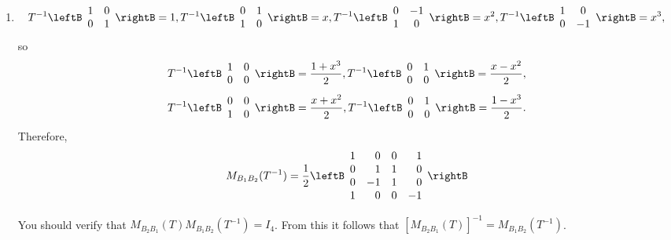 \begin{solution}
\begin{enumerate}
\item 
\[ T^{-1}\leftB\begin{array}{cc} 1 & 0 \\ 0 & 1 \end{array}\rightB = 1, 
T^{-1}\leftB\begin{array}{cc} 0 & 1 \\ 1 & 0 \end{array}\rightB= x,
T^{-1}\leftB\begin{array}{cc} 0 & -1 \\ 1 & 0 \end{array}\rightB= x^2,
T^{-1}\leftB\begin{array}{cc} 1 & 0 \\ 0 & -1 \end{array}\rightB=x^3,\]
so
\[ T^{-1}\leftB\begin{array}{cc} 1 & 0 \\ 0 & 0 \end{array}\rightB = \frac{1+x^3}{2},
T^{-1}\leftB\begin{array}{cc} 0 & 1 \\ 0 & 0 \end{array}\rightB= \frac{x-x^2}{2}, \]
\[ T^{-1}\leftB\begin{array}{cc} 0 & 0 \\ 1 & 0 \end{array}\rightB = \frac{x+x^2}{2},
T^{-1}\leftB\begin{array}{cc} 0 & 1 \\ 0 & 0 \end{array}\rightB= \frac{1-x^3}{2}. \]
Therefore,
\[ M_{B_1B_2}(T^{-1})=\frac{1}{2}\leftB\begin{array}{rrrr}
1 & 0 & 0 & 1 \\
0 & 1 & 1 & 0 \\
0 & -1 & 1 & 0 \\
1 & 0 & 0 & -1 \end{array}\rightB \]

You should verify that $M_{B_2B_1}(T) M_{B_1B_2}(T^{-1}) = I_4$. From this it follows that $[M_{B_2B_1}(T)]^{-1}= M_{B_1B_2}(T^{-1})$.


\end{enumerate}
\end{solution}
